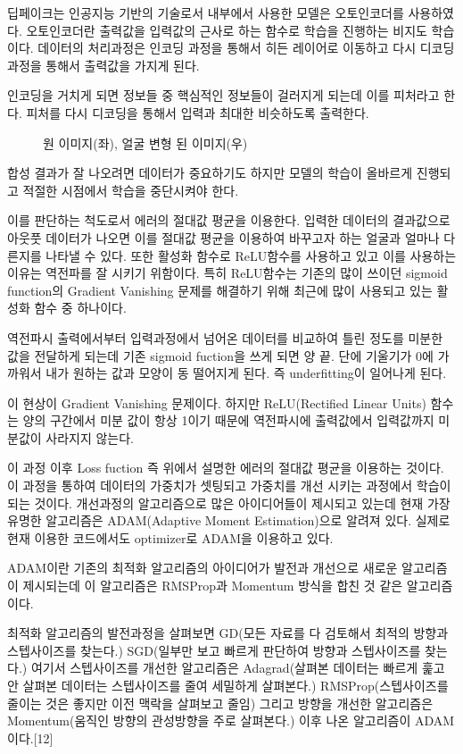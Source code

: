 딥페이크는 인공지능 기반의 기술로서 내부에서 사용한 모델은 오토인코더를 사용하였다. 오토인코더란 출력값을 입력값의 근사로 하는 함수로 학습을 진행하는 비지도 학습이다. 데이터의 처리과정은 인코딩 과정을 통해서 히든 레이어로 이동하고 다시 디코딩 과정을 통해서 출력값을 가지게 된다.

인코딩을 거치게 되면 정보들 중 핵심적인 정보들이 걸러지게 되는데 이를 피처라고 한다. 피처를 다시 디코딩을 통해서 입력과 최대한 비슷하도록 출력한다.

\begin{figure}[h!]
\centering
\caption{원 이미지(좌), 얼굴 변형 된 이미지(우)}
\end{figure}

합성 결과가 잘 나오려면 데이터가 중요하기도 하지만 모델의 학습이 올바르게 진행되고 적절한 시점에서 학습을 중단시켜야 한다.

이를 판단하는 척도로서 에러의 절대값 평균을 이용한다. 입력한 데이터의 결과값으로 아웃풋 데이터가 나오면 이를 절대값 평균을 이용하여 바꾸고자 하는 얼굴과 얼마나 다른지를 나타낼 수 있다. 또한 활성화 함수로 ReLU함수를 사용하고 있고 이를 사용하는 이유는 역전파를 잘 시키기 위함이다. 특히 ReLU함수는 기존의 많이 쓰이던 sigmoid function의 Gradient Vanishing 문제를 해결하기 위해 최근에 많이 사용되고 있는 활성화 함수 중 하나이다.

역전파시 출력에서부터 입력과정에서 넘어온 데이터를 비교하여 틀린 정도를 미분한 값을 전달하게 되는데 기존 sigmoid fuction을 쓰게 되면 양 끝. 단에 기울기가 0에 가까워서 내가 원하는 값과 모양이 동 떨어지게 된다. 즉 underfitting이 일어나게 된다.

이 현상이 Gradient Vanishing 문제이다. 하지만 ReLU(Rectified Linear Units) 함수는 양의 구간에서 미분 값이 항상 1이기 때문에 역전파시에 출력값에서 입력값까지 미분값이 사라지지 않는다.

이 과정 이후 Loss fuction 즉 위에서 설명한 에러의 절대값 평균을 이용하는 것이다. 이 과정을 통하여 데이터의 가중치가 셋팅되고 가중치를 개선 시키는 과정에서 학습이 되는 것이다. 개선과정의 알고리즘으로 많은 아이디어들이 제시되고 있는데 현재 가장 유명한 알고리즘은 ADAM(Adaptive Moment Estimation)으로 알려져 있다. 실제로 현재 이용한 코드에서도 optimizer로 ADAM을 이용하고 있다.

ADAM이란 기존의 최적화 알고리즘의 아이디어가 발전과 개선으로 새로운 알고리즘이 제시되는데 이 알고리즘은 RMSProp과 Momentum 방식을 합친 것 같은 알고리즘이다.

최적화 알고리즘의 발전과정을 살펴보면 GD(모든 자료를 다 검토해서 최적의 방향과 스텝사이즈를 찾는다.) SGD(일부만 보고 빠르게 판단하여 방향과 스텝사이즈를 찾는다.) 여기서 스텝사이즈를 개선한 알고리즘은 Adagrad(살펴본 데이터는 빠르게 훑고 안 살펴본 데이터는 스텝사이즈를 줄여 세밀하게 살펴본다.) RMSProp(스텝사이즈를 줄이는 것은 좋지만 이전 맥락을 살펴보고 줄임) 그리고 방향을 개선한 알고리즘은 Momentum(움직인 방향의 관성방향을 주로 살펴본다.) 이후 나온 알고리즘이 ADAM이다.[12]

